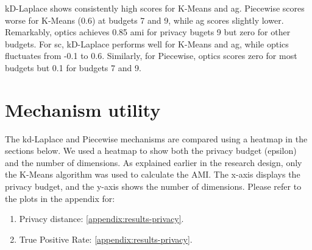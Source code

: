 kD-Laplace shows consistently high scores for K-Means and \gls{ag}.
Piecewise scores worse for K-Means (0.6) at budgets 7 and 9, while \gls{ag} scores slightly lower.
Remarkably, \gls{optics} achieves 0.85 \gls{ami} for privacy bugets 9 but zero for other budgets. For \gls{sc}, kD-Laplace performs well for K-Means and \gls{ag}, while \gls{optics} fluctuates from -0.1 to 0.6.
Similarly, for Piecewise, \gls{optics} scores zero for most budgets but 0.1 for budgets 7 and 9.

\newpage
\section{Mechanism utility}
The kd-Laplace and Piecewise mechanisms are compared using a heatmap in the sections below.
We used a heatmap to show both the privacy budget (epsilon) and the number of dimensions.
As explained earlier in the research design, only the K-Means algorithm was used to calculate the AMI.
The x-axis displays the privacy budget, and the y-axis shows the number of dimensions. \newline
Please refer to the plots in the appendix for:
\begin{enumerate}
  \item Privacy distance: \ref{appendix:results-privacy}.
  \item True Positive Rate: \ref{appendix:results-privacy}.
\end{enumerate}
\newpage
